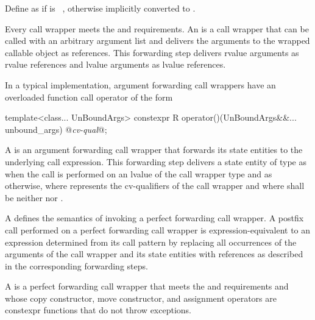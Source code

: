 \pnum
{}%
Define  as
if  is \cv{}~, otherwise
 implicitly converted
to .

\pnum
{}%
%
%
Every call wrapper meets the 
and  requirements.
An  is a
call wrapper that can be called with an arbitrary argument list
and delivers the arguments to the wrapped callable object as references.
This forwarding step delivers rvalue arguments as rvalue references
and lvalue arguments as lvalue references.
\begin{note}
In a typical implementation, argument forwarding call wrappers have
an overloaded function call operator of the form
\begin{codeblock}
template<class... UnBoundArgs>
  constexpr R operator()(UnBoundArgs&&... unbound_args) @\textit{cv-qual}@;
\end{codeblock}
\end{note}

\pnum
{}%
A  is
an argument forwarding call wrapper
that forwards its state entities to the underlying call expression.
This forwarding step delivers a state entity of type 
as \cv{} 
when the call is performed on an lvalue of the call wrapper type and
as \cv{}  otherwise,
where \cv{} represents the cv-qualifiers of the call wrapper and
where \cv{} shall be neither  nor .

\pnum
A  defines the semantics of invoking
a perfect forwarding call wrapper.
A postfix call performed on a perfect forwarding call wrapper is
expression-equivalent to
an expression  determined from its call pattern 
by replacing all occurrences
of the arguments of the call wrapper and its state entities
with references as described in the corresponding forwarding steps.

\pnum
A  is a perfect forwarding call wrapper that meets
the  and  requirements
and whose copy constructor, move constructor, and assignment operators
are constexpr functions that do not throw exceptions.


